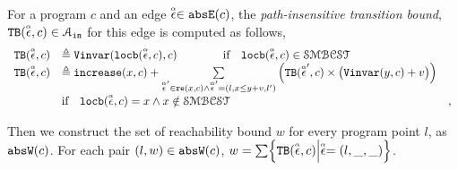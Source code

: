 \begin{enumerate}

\begin{defn}
  \label{def:edge_pathinsensitivebound}
  For a program $c$ and an edge $\absevent \in \absE(c)$, the \emph{path-insensitive transition bound},
  $\absclr(\absevent, c) \in \mathcal{A}_{\lin}$ 
for this edge is
computed as follows,
\[ 
\begin{array}{lll}
  \absclr(\absevent, c) 
  & \triangleq \varinvar(\locbound(\absevent, c), c)   \qquad \qquad  \text{if} \quad  \locbound(\absevent, c) \in \constdom & \\
  \absclr(\absevent, c) 
  & \triangleq \incrs(x, c) 
   + 
  \sum\limits_{\absevent' \in \reset(x, c) \land \absevent' = (l, x \leq y + v, l') }
  \Big( \absclr(\absevent', c) \times \big( \varinvar(y, c) + v \big) \Big)
  & \\
  &  \text{if} \quad  \locbound(\absevent, c) = x \land x \notin \constdom & ,
\end{array}
  \]
\end{defn}

Then we construct the set of reachability bound $w$ for every program point $l$, as $\absW(c)$.
For each pair $(l, w) \in \absW(c)$, $w = \sum\left\{  \absclr(\absevent, c) \middle\vert \absevent = (l, \_, \_) \right\}$.


\end{enumerate}
